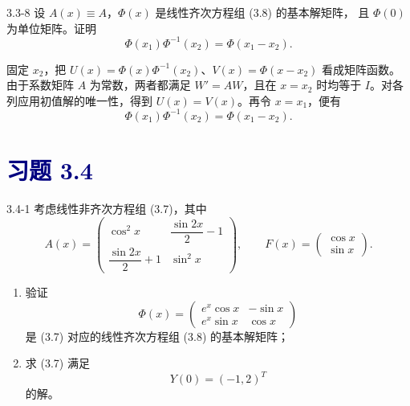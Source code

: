 \documentclass[UTF8,a4paper,11pt]{ctexart}
\newcommand{\sect}[1]{\section*{\textcolor{navy}{习题 #1}}}
\begin{document}
\begin{problem}{3.3-8}
设 $A(x)\equiv A$，$\Phi(x)$ 是线性齐次方程组 (3.8) 的基本解矩阵，
  且 $\Phi(0)$ 为单位矩阵。证明
  \[
    \Phi(x_1)\Phi^{-1}(x_2)=\Phi(x_1-x_2).
  \]
\end{problem}

\begin{solution}
固定 $x_2$，把 $U(x)=\Phi(x)\Phi^{-1}(x_2)$、$V(x)=\Phi(x-x_2)$ 看成矩阵函数。由于系数矩阵 $A$ 为常数，两者都满足 $W'=AW$，且在 $x=x_2$ 时均等于 $I$。对各列应用初值解的唯一性，得到 $U(x)=V(x)$。再令 $x=x_1$，便有
\[\boxed{\Phi(x_1)\Phi^{-1}(x_2)=\Phi(x_1-x_2)}.\]
\end{solution}

\sect{3.4}
\begin{problem}{3.4-1}
考虑线性非齐次方程组 (3.7)，其中
  \[
    A(x)=
    \begin{pmatrix}
      \cos^2x & \dfrac{\sin2x}{2}-1\\[6pt]
      \dfrac{\sin2x}{2}+1 & \sin^2x
    \end{pmatrix},
    \qquad
    F(x)=
    \begin{pmatrix}
      \cos x\\
      \sin x
    \end{pmatrix}.
  \]
  \begin{enumerate}[label=(\arabic*)]
    \item 验证
    \[
      \Phi(x)=
      \begin{pmatrix}
        e^x\cos x & -\sin x\\
        e^x\sin x & \cos x
      \end{pmatrix}
    \]
    是 (3.7) 对应的线性齐次方程组 (3.8) 的基本解矩阵；

    \item 求 (3.7) 满足
    \[
      Y(0)=(-1,2)^T
    \]
    的解。
  \end{enumerate}
\end{problem}
\end{document}
